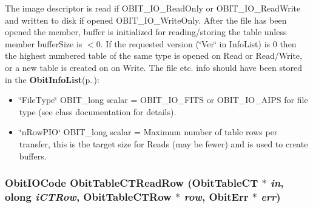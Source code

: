 The image descriptor is read if OBIT\_\-IO\_\-Read\-Only or OBIT\_\-IO\_\-Read\-Write and written to disk if opened OBIT\_\-IO\_\-Write\-Only. After the file has been opened the member, buffer is initialized for reading/storing the table unless member buffer\-Size is $<$0. If the requested version (\char`\"{}Ver\char`\"{} in Info\-List) is 0 then the highest numbered table of the same type is opened on Read or Read/Write, or a new table is created on on Write. The file etc. info should have been stored in the {\bf Obit\-Info\-List}{\rm (p.\,\pageref{structObitInfoList})}: \begin{itemize}
\item \char`\"{}File\-Type\char`\"{} OBIT\_\-long scalar = OBIT\_\-IO\_\-FITS or OBIT\_\-IO\_\-AIPS for file type (see class documentation for details). \item \char`\"{}n\-Row\-PIO\char`\"{} OBIT\_\-long scalar = Maximum number of table rows per transfer, this is the target size for Reads (may be fewer) and is used to create buffers. 
\end{itemize}
\subsubsection{\setlength{\rightskip}{0pt plus 5cm}Obit\-IOCode Obit\-Table\-CTRead\-Row ({\bf Obit\-Table\-CT} $\ast$ {\em in}, {\bf olong} {\em i\-CTRow}, {\bf Obit\-Table\-CTRow} $\ast$ {\em row}, {\bf Obit\-Err} $\ast$ {\em err})}\label{ObitTableCT_8h_a18}


